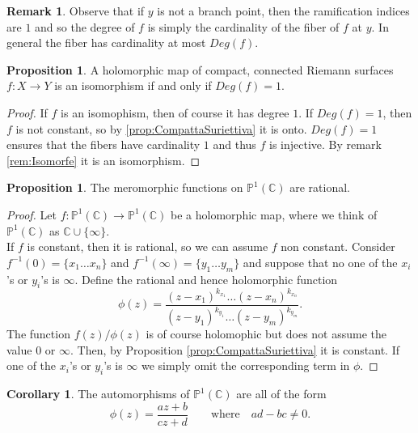 \documentclass[12pt,a4paper,openright,twoside]{report}
\theoremstyle{definition} %
\newtheorem{proposition}[theorem]{Proposition}
\newtheorem{corollary}[theorem]{Corollary}
\newtheorem{remark}[theorem]{Remark}
\def \C {\mathbb{C}}
\def \PP {\mathbb{P}^1(\C)}
\begin{document}
\begin{remark}
    Observe that if \(y\) is not a branch point, then the ramification indices are \(1\) and so the degree of \(f\) is simply the cardinality of the fiber of \(f\) at \(y\). In general the fiber has cardinality at most \(Deg(f)\).
\end{remark}

\begin{proposition}
    A holomorphic map of compact, connected Riemann surfaces \(f : X \to Y\) is an isomorphism if and only if \(Deg(f) = 1\).
\end{proposition}

\begin{proof}
    If \(f\) is an isomophism, then of course it has degree \(1\).
    If \(Deg(f)=1\), then \(f\) is not constant, so by \ref{prop:CompattaSuriettiva} it is onto. \(Deg(f)=1\) ensures that the fibers have cardinality \(1\) and thus \(f\) is injective. By remark \ref{rem:Isomorfe} it is an isomorphism.
\end{proof}

\begin{proposition}
    The meromorphic functions on \(\PP\) are rational.
\end{proposition}

\begin{proof}
    Let \(f : \PP \to \PP\) be a holomorphic map, where we think of \(\PP\) as \(\C \cup \{\infty\}\).\\
    If \(f\) is constant, then it is rational, so we can assume \(f\) non constant.
    Consider \(f^{-1}(0) = \{x_1 \ldots x_n\} \) and \(f^{-1}(\infty) = \{y_1 \ldots y_m\}\) and suppose that no one of the \(x_i\)'s or \(y_i\)'s is \(\infty\).
    Define the rational and hence holomorphic function
    \[
    \phi(z) = \frac{ (z-x_1)^{k_{x_1}} \ldots (z-x_n)^{k_{x_n}} }{ (z-y_1)^{k_{y_1}} \ldots (z-y_m)^{k_{y_m}} }.
    \]
    The function \( f(z) \slash \phi(z)\) is of course holomophic but does not assume the value \(0\) or \(\infty\). Then, by Proposition \ref{prop:CompattaSuriettiva} it is constant.
    If one of the \(x_i\)'s or \(y_i\)'s is \(\infty\) we simply omit the corresponding term in \(\phi\).
    \end{proof}

    \begin{corollary}
        The automorphisms of \(\PP\) are all of the form
        \[
        \phi(z) = \frac{az+b}{cz+d} \qquad \text{where} \quad ad-bc \neq 0.
        \]
    \end{corollary}
\end{document}
